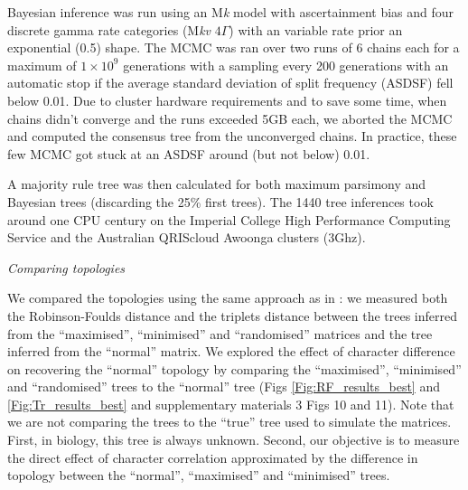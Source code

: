 \documentclass[12pt,letterpaper]{article}
\renewcommand{\subsection}[1]{%
\bigskip
\begin{center}
\begin{large}
\normalfont\itshape #1
\end{large}
\end{center}}
\begin{document}
Bayesian inference was run using an M\textit{k} model with ascertainment bias and four discrete gamma rate categories (M\textit{kv} $4\Gamma$)
with an variable rate prior an exponential (0.5) shape.
The MCMC was ran over two runs of 6 chains each for a maximum of $1\times10^9$ generations with a sampling every 200 generations with an automatic stop if the average standard deviation of split frequency (ASDSF) fell below 0.01.
Due to cluster hardware requirements and to save some time, when chains didn't converge and the runs exceeded 5GB each, we aborted the MCMC and computed the consensus tree from the unconverged chains.
In practice, these few MCMC got stuck at an ASDSF around (but not below) 0.01.

A majority rule tree was then calculated for both maximum parsimony and Bayesian trees (discarding the 25\% first trees).
The 1440 tree inferences took around one CPU century on the Imperial College High Performance Computing Service \citep[2-3GHz clock rate;][]{HPC} and the Australian QRIScloud Awoonga clusters (3Ghz).

\subsection{Comparing topologies}
We compared the topologies using the same approach as in \cite{Guillerme2016146}: we measured both the Robinson-Foulds distance \citep{RF1981} and the triplets distance \citep{dobson1975triplets} between the trees inferred from the ``maximised'', ``minimised'' and ``randomised'' matrices and the tree inferred from the ``normal'' matrix.
We explored the effect of character difference on recovering the ``normal'' topology by comparing the ``maximised'', ``minimised'' and ``randomised'' trees to the ``normal'' tree (Figs \ref{Fig:RF_results_best} and \ref{Fig:Tr_results_best} and supplementary materials 3 Figs 10 and 11).
Note that we are not comparing the trees to the ``true'' tree used to simulate the matrices.
First, in biology, this tree is always unknown.
Second, our objective is to measure the direct effect of character correlation approximated by the difference in topology between the ``normal'', ``maximised'' and ``minimised'' trees.
\end{document}
